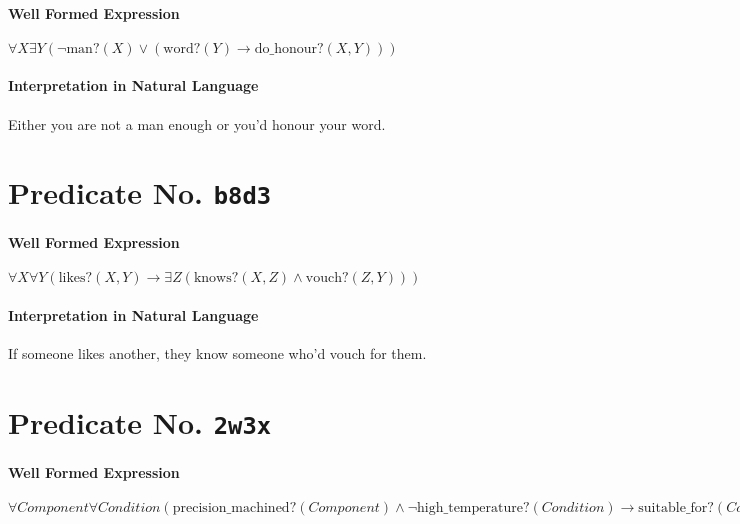 \documentclass[11pt]{article}
\begin{document}
\paragraph*{Well Formed Expression}
\label{sec:orgd49e7d6}

\(\forall X \exists Y (\neg \text{man?}(X) \lor (\text{word?}(Y) \rightarrow \text{do\_honour?}(X, Y)))\)

\paragraph*{Interpretation in Natural Language}
\label{sec:orga7f899a}

Either you are not a man enough or you’d honour your word.



\section{Predicate No. \texttt{b8d3}}
\label{sec:orgd364092}

\paragraph*{Well Formed Expression}
\label{sec:org413f235}

\(\forall X \forall Y (\text{likes?}(X, Y) \rightarrow \exists Z (\text{knows?}(X, Z) \land \text{vouch?}(Z, Y)))\)

\paragraph*{Interpretation in Natural Language}
\label{sec:org1085205}

If someone likes another, they know someone who'd vouch for them.



\section{Predicate No. \texttt{2w3x}}
\label{sec:org940bf23}

\paragraph*{Well Formed Expression}
\label{sec:orgd42e902}

\(\forall \mathit{Component} \forall \mathit{Condition} (\mathrm{precision\_machined?}(\mathit{Component}) \land \neg \mathrm{high\_temperature?}(\mathit{Condition}) \rightarrow \mathrm{suitable\_for?}(\mathit{Component}, \mathit{Condition}))\)
\end{document}
